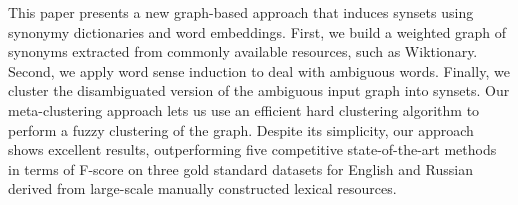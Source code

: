 This paper presents a new graph-based approach that induces synsets using synonymy dictionaries and word embeddings. First, we build a weighted graph of synonyms extracted from commonly available resources, such as Wiktionary. Second, we apply word sense induction to deal with ambiguous words. Finally, we cluster the disambiguated version of the ambiguous input graph into synsets. Our meta-clustering approach lets us use an efficient hard clustering algorithm to perform a fuzzy clustering of the graph. Despite its simplicity, our approach shows excellent results, outperforming five competitive state-of-the-art methods in terms of F-score on three gold standard datasets for English and Russian derived from large-scale manually constructed lexical resources.
